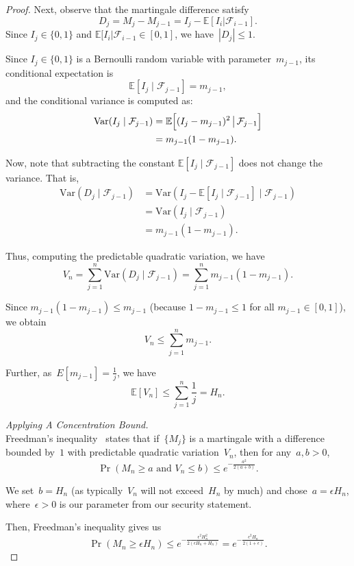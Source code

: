 \begin{proof}
Next, observe that the martingale difference satisfy
$$D_j = M_j - M_{j-1} = I_j - \mathbb{E}[I_i | \mathcal{F}_{i-1}].$$
Since $I_j \in \{0,1\}$ and $\mathbb{E}[I_i | \mathcal{F}_{i-1} \in [0,1]$, we have~$|D_j| \leq 1$. 

Since $I_j\in\{0,1\}$ is a Bernoulli random variable with parameter~$m_{j-1}$, its conditional expectation is
$$
\mathbb{E}[I_j\mid \mathcal{F}_{j-1}] = m_{j-1},
$$
and the conditional variance is computed as:
\begin{align*}
\mathrm{Var}(I_j\mid \mathcal{F}_{j-1}) &= \mathbb{E}\Bigl[(I_j - m_{j-1})^2 \,\big|\, \mathcal{F}_{j-1}\Bigr] \\
&= m_{j-1}(1-m_{j-1}).
\end{align*}

Now, note that subtracting the constant $\mathbb{E}[I_j\mid \mathcal{F}_{j-1}]$ does not change the variance. That is,
\begin{align*}
    \mathrm{Var}(D_j\mid \mathcal{F}_{j-1}) &= \mathrm{Var}(I_j - \mathbb{E}[I_j\mid \mathcal{F}_{j-1}]\mid \mathcal{F}_{j-1})\\
&= \mathrm{Var}(I_j\mid \mathcal{F}_{j-1})\\
&= m_{j-1}(1-m_{j-1}).
\end{align*}

Thus, computing the predictable quadratic variation, we have
$$V_n = \sum_{j=1}^{n} \mathrm{Var}(D_j\mid \mathcal{F}_{j-1}) = \sum_{j=1}^{n} m_{j-1}(1-m_{j-1}).$$

Since $m_{j-1}(1-m_{j-1}) \leq m_{j-1}$ (because $1-m_{j-1}\le 1$ for all $m_{j-1}\in [0,1]$), we obtain
$$V_n \le \sum_{j=1}^{n} m_{j-1}.$$

Further, as~$E[m_{j-1}] = \frac{1}{j}$, we have
$$\mathbb{E}[V_n] \leq \sum_{j=1}^{n} \frac{1}{j} = H_n.$$

\textit{Applying A Concentration Bound.}\\

Freedman's inequality~\cite{freedman1975tail} states that if~$\{M_j\}$ is a martingale with a difference bounded by~$1$ with predictable quadratic variation~$V_n$, then for any~$a,b>0$,
$$\Pr(M_{n} \geq a \text{ and } V_n \leq b) \leq e^{-\frac{a^{2}}{2(a+b)}}.$$

We set~$b = H_n$ (as typically~$V_n$ will not exceed~$H_n$ by much) and chose~$a = \epsilon H_n$, where~$\epsilon > 0$ is our parameter from our security statement. 

Then, Freedman's inequality gives us
$$\Pr(M_n \geq \epsilon H_n) \leq  e^{-\frac{\epsilon^2H_{n}^{2}}{2(\epsilon H_n+H_n)}} = e^{-\frac{\epsilon^2 H_{n}}{2(1 + \epsilon)}}.$$


\end{proof}
